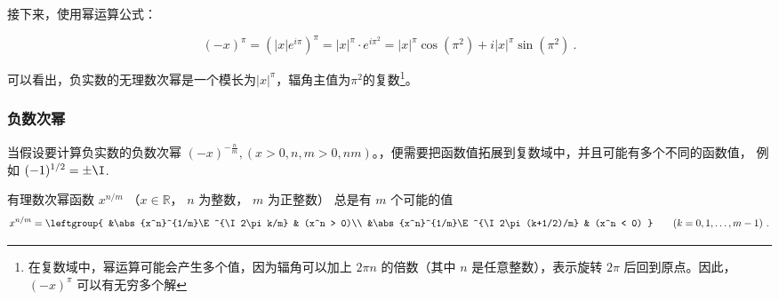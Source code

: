 接下来，使用幂运算公式：

\begin{equation}
(-x)^\pi = \left( |x| e^{i\pi} \right)^\pi =|x|^\pi \cdot e^{i\pi^2}=|x|^\pi\cos(\pi^2) + i|x|^\pi\sin(\pi^2)~.
\end{equation}

可以看出，负实数的无理数次幂是一个模长为$|x|^\pi$，辐角主值为$\pi^2$的复数\footnote{在复数域中，幂运算可能会产生多个值，因为辐角可以加上 $2\pi n$ 的倍数（其中 $n$ 是任意整数），表示旋转 $2\pi$ 后回到原点。因此，$(-x)^\pi$ 可以有无穷多个解}。

\subsubsection{负数次幂}

当假设要计算负实数的负数次幂 $\displaystyle(-x)^{-\frac{n}{m}},(x>0,n,m>0,nm)$。，便需要把函数值拓展到复数域中，并且可能有多个不同的函数值， 例如 $(-1)^{1/2} = \pm\I$. 

有理数次幂函数 $x^{n/m}$ （$x\in \mathbb R$， $n$ 为整数， $m$ 为正整数） 总是有 $m$ 个可能的值
\begin{equation}
x^{n/m} = \leftgroup{
&\abs{x^n}^{1/m}\E^{\I 2\pi k/m} & (x^n > 0)\\
&\abs{x^n}^{1/m}\E^{\I 2\pi (k+1/2)/m} & (x^n < 0)
}\qquad (k = 0,1,\dots, m-1)~.
\end{equation}